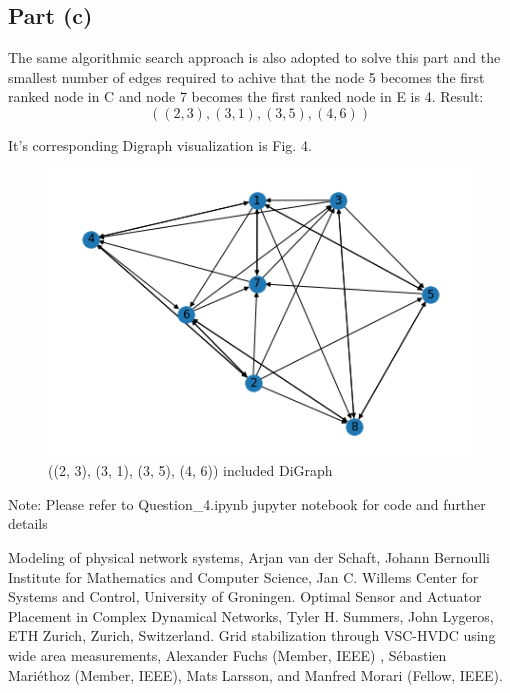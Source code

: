 \documentclass[conference]{IEEEtran}
\begin{document}
\subsection{Part (c)}
The same algorithmic search approach is also adopted to solve this part and the smallest number of edges required to achive that the node 5 becomes the first ranked node in C and node 7 becomes the first ranked node in E is 4. Result:
\[((2, 3), (3, 1), (3, 5), (4, 6))\]

It's corresponding Digraph visualization is Fig. 4.
\begin{figure}[htbp]
\centerline{\includegraphics[scale=0.6]{img43.png}}
\caption{((2, 3), (3, 1), (3, 5), (4, 6)) included DiGraph}
\label{fig3}
\end{figure}

Note: Please refer to Question\_4.ipynb jupyter notebook for code and further details

\begin{thebibliography}{00}
 Modeling of physical network systems, Arjan van der Schaft, Johann Bernoulli Institute for Mathematics and Computer Science, Jan C. Willems Center for Systems and Control, University of Groningen.
 Optimal Sensor and Actuator Placement in
Complex Dynamical Networks, Tyler H. Summers, John Lygeros, ETH Zurich, Zurich, Switzerland.
 Grid stabilization through VSC-HVDC using wide
area measurements, Alexander Fuchs (Member, IEEE) , Sébastien Mariéthoz (Member, IEEE), Mats Larsson,
and Manfred Morari (Fellow, IEEE).
\end{thebibliography}
\vspace{12pt}
\end{document}
